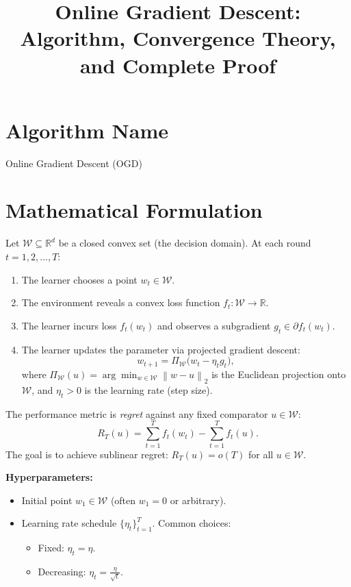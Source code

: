 \documentclass{article}
\title{Online Gradient Descent: Algorithm, Convergence Theory, and Complete Proof}
\author{}
\date{}
\newcommand{\R}{\mathbb{R}}
\newcommand{\norm}[1]{\left\| #1 \right\|}
\begin{document}
\maketitle

\section*{Algorithm Name}
Online Gradient Descent (OGD)

\section*{Mathematical Formulation}
Let $\mathcal{W} \subseteq \R^d$ be a closed convex set (the decision domain). At each round $t = 1, 2, \dots, T$:
\begin{enumerate}
    \item The learner chooses a point $w_t \in \mathcal{W}$.
    \item The environment reveals a convex loss function $f_t : \mathcal{W} \to \R$.
    \item The learner incurs loss $f_t(w_t)$ and observes a subgradient $g_t \in \partial f_t(w_t)$.
    \item The learner updates the parameter via projected gradient descent:
    \begin{equation}
        w_{t+1} = \Pi_{\mathcal{W}} \bigl( w_t - \eta_t g_t \bigr),
    \end{equation}
    where $\Pi_{\mathcal{W}}(u) = \arg\min_{w \in \mathcal{W}} \norm{w - u}_2$ is the Euclidean projection onto $\mathcal{W}$, and $\eta_t > 0$ is the learning rate (step size).
\end{enumerate}
The performance metric is \textit{regret} against any fixed comparator $u \in \mathcal{W}$:
\begin{equation}
    R_T(u) = \sum_{t=1}^T f_t(w_t) - \sum_{t=1}^T f_t(u).
\end{equation}
The goal is to achieve sublinear regret: $R_T(u) = o(T)$ for all $u \in \mathcal{W}$.

\textbf{Hyperparameters:}
\begin{itemize}
    \item Initial point $w_1 \in \mathcal{W}$ (often $w_1 = 0$ or arbitrary).
    \item Learning rate schedule $\{\eta_t\}_{t=1}^T$. Common choices:
    \begin{itemize}
        \item Fixed: $\eta_t = \eta$.
        \item Decreasing: $\eta_t = \frac{\eta}{\sqrt{t}}$.
    \end{itemize}
\end{itemize}
\end{document}
